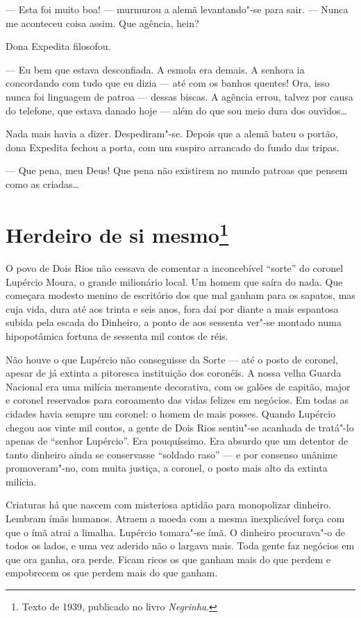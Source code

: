 --- Esta foi muito boa! --- murmurou a alemã levantando"-se para sair.
--- Nunca me aconteceu coisa assim. Que agência, hein?

Dona Expedita filosofou.

--- Eu bem que estava desconfiada. A esmola era demais. A senhora ia
concordando com tudo que eu dizia --- até com os banhos quentes! Ora,
isso nunca foi linguagem de patroa --- dessas biscas. A agência errou,
talvez por causa do telefone, que estava danado hoje --- além do que sou
meio dura dos ouvidos\ldots{}

Nada mais havia a dizer. Despediram"-se. Depois que a alemã bateu o
portão, dona Expedita fechou a porta, com um suspiro arrancado do fundo
das tripas.

--- Que pena, meu Deus! Que pena não existirem no mundo patroas que
pensem como as criadas\ldots{}

\chapter{Herdeiro de si mesmo\footnote[*]{Texto de 1939, publicado no livro \emph{Negrinha}.}}

O povo de Dois Rios não cessava de comentar a inconcebível ``sorte'' do
coronel Lupércio Moura, o grande milionário local. Um homem que saíra do
nada. Que começara modesto menino de escritório dos que mal ganham para
os sapatos, mas cuja vida, dura até aos trinta e seis anos, fora daí por
diante a mais espantosa subida pela escada do Dinheiro, a ponto de aos
sessenta ver"-se montado numa hipopotâmica fortuna de sessenta mil contos
de réis.

Não houve o que Lupércio não conseguisse da Sorte --- até o posto de
coronel, apesar de já extinta a pitoresca instituição dos coronéis. A
nossa velha Guarda Nacional era uma milícia meramente decorativa, com os
galões de capitão, major e coronel reservados para coroamento das vidas
felizes em negócios. Em todas as cidades havia sempre um coronel: o
homem de mais posses. Quando Lupércio chegou aos vinte mil contos, a
gente de Dois Rios sentiu"-se acanhada de tratá"-lo apenas de ``senhor
Lupércio''. Era pouquíssimo. Era absurdo que um detentor de tanto
dinheiro ainda se conservasse ``soldado raso'' --- e por consenso
unânime promoveram"-no, com muita justiça, a coronel, o posto mais alto
da extinta milícia.

Criaturas há que nascem com misteriosa aptidão para monopolizar
dinheiro. Lembram ímãs humanos. Atraem a moeda com a mesma inexplicável
força com que o ímã atrai a limalha. Lupércio tomara"-se ímã. O dinheiro
procurava"-o de todos os lados, e uma vez aderido não o largava mais.
Toda gente faz negócios em que ora ganha, ora perde. Ficam ricos os que
ganham mais do que perdem e empobrecem os que perdem mais do que ganham.

